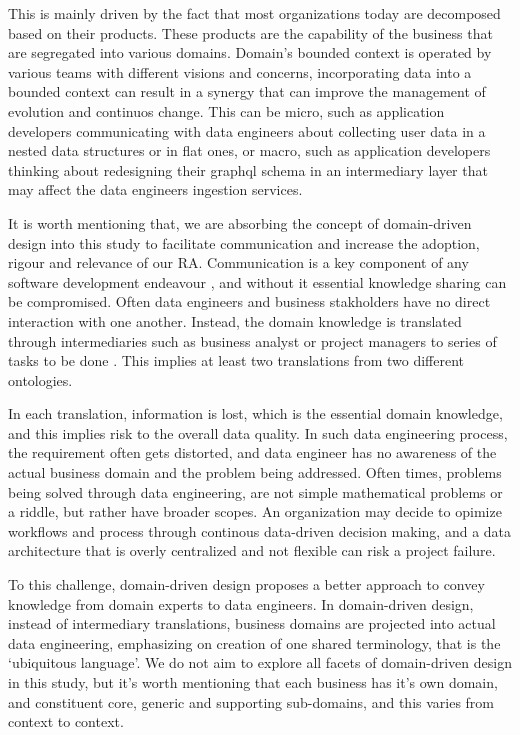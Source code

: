 \documentclass{bmcart}
\begin{document}
This is mainly driven by the fact that most organizations today are decomposed based on their products. These products are the capability of the business that are segregated into various domains. Domain's bounded context is operated by various teams with different visions and concerns, incorporating data into a bounded context can result in a synergy that can improve the management of evolution and continuos change. This can be micro, such as application developers communicating with data engineers about collecting user data in a nested data structures or in flat ones, or macro, such as application developers thinking about redesigning their graphql schema in an intermediary layer that may affect the data engineers ingestion services.

It is worth mentioning that, we are absorbing the concept of domain-driven design into this study to facilitate communication and increase the adoption, rigour and relevance of our RA. Communication is a key component of any software development endeavour \cite{sudhakar2012model}, and without it essential knowledge sharing can be compromised. Often data engineers and business stakholders have no direct interaction with one another. Instead, the domain knowledge is translated through intermediaries such as business analyst or project managers to series of tasks to be done \cite{khononov2021learning}. This implies at least two translations from two different ontologies. 

In each translation, information is lost, which is the essential domain knowledge, and this implies risk to the overall data quality. In such data engineering process, the requirement often gets distorted, and data engineer has no awareness of the actual business domain and the problem being addressed. Often times, problems being solved through data engineering, are not simple mathematical problems or a riddle, but rather have broader scopes. An organization may decide to opimize workflows and process through continous data-driven decision making, and a data architecture that is overly centralized and not flexible can risk a project failure. 

To this challenge, domain-driven design proposes a better approach to convey knowledge from domain experts to data engineers. In domain-driven design, instead of intermediary translations, business domains are projected into actual data engineering, emphasizing on creation of one shared terminology, that is the `ubiquitous language'. We do not aim to explore all facets of domain-driven design in this study, but it's worth mentioning that each business has it's own domain, and constituent core, generic and supporting sub-domains, and this varies from context to context.
\end{document}
